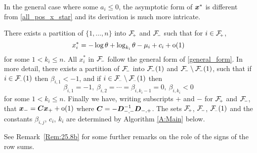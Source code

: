 In the general case where some $a_i\le 0$, the asymptotic form of $\bm{x}^*$ is
different from \eqref{all_pos_x_star} and its derivation is much more
intricate.

\begin{theorem}\label{Th:24.8a}
There exists a partition of $\{1,\ldots,n\}$ into $\Fset{+}$ and $\Fset{-}$
such that for $i \in \Fset{+}$,
\[
x_i^*=-\log\theta+\log_{k_i}\theta- \mu_i + c_i +{\mathrm{o}}(1)
\]
for some $1<k_i\le n$. All $x_i^*$ in $\Fset{-}$ follow the general form of
\eqref{general_form}.  In more detail, there exists a partition of $\Fset{-}$
into $\Fset{-}(1)$ and $\Fset{-} \setminus \Fset{-}(1)$, such that if $i\in
\Fset{-}(1)$ then $\beta_{i,1} < -1$, and if $i \in \Fset{-} \setminus
\Fset{-}(1)$ then
\[ \beta_{i,1} = -1,\ \beta_{i,2} = \cdots = \beta_{i,k_i-1} = 0,\ \beta_{i,k_i}
< 0 \]
for some $1<k_i\le n$.  Finally we have, writing subscripts $+$ and $-$ for
$\Fset{+}$ and $\Fset{-}$, that $\bm{x}_{-} = \bm{C} \bm{x}_{+} + {\mathrm{o}}(1)$ where
$\bm{C} = -\bm{D}_{{-},{-}}^{-1}\bm{D}_{{-},{+}}$. The sets $\Fset{+}$, $\Fset{-}$,
$\Fset{-}(1)$ and the constants $\beta_{i,j}$, $c_i$, $k_i$ are determined by
Algorithm \ref{A:Main} below.
\end{theorem}

See Remark~\ref{Rem:25.8b} for some further remarks on the role of the signs
of the row sums.

